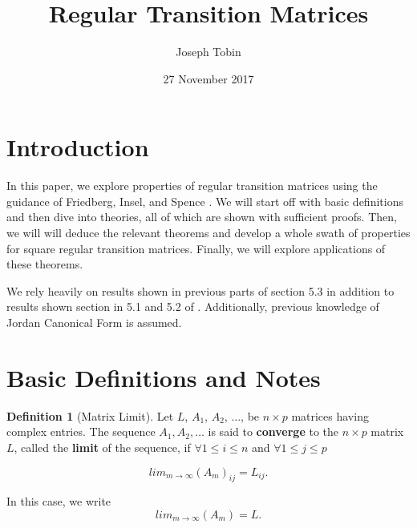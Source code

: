 \documentclass{amsart}
\title{Regular Transition Matrices}
\author{Joseph Tobin}
\date{27 November 2017}
\theoremstyle{definition}
\newtheorem{definition}[thm]{Definition}
\theoremstyle{remark}
\numberwithin{equation}{section}
\begin{document}
\maketitle




\section{Introduction}
In this paper, we explore properties of regular transition matrices using the guidance of Friedberg, Insel, and Spence \cite{friedberg2003linear}.
We will start off with basic definitions and then dive into theories, all of which are shown with sufficient proofs.
Then, we will will deduce the relevant theorems and develop a whole swath of properties for square regular transition matrices.
Finally, we will explore applications of these theorems.


We rely heavily on results shown in previous parts of section 5.3 in addition to results shown section in 5.1 and 5.2 of \cite{friedberg2003linear}.
Additionally, previous knowledge of Jordan Canonical Form is assumed.

\section{Basic Definitions and Notes}

\begin{definition}[Matrix Limit]
Let $L$, $A_1$, $A_2$, $\ldots$, be $n \times p$ matrices having complex entries.
The sequence $A_1, A_2, \ldots$ is said to \textbf{converge} to the $n \times p$ matrix $L$, called the \textbf{limit} of the sequence, if $\forall 1 \leq i \leq n$ and $\forall 1 \leq j \leq p$

$$lim_{m \to \infty}(A_m)_{ij} = L_{ij}.$$

In this case, we write $$ lim_{m \to \infty}(A_m) = L.$$


\end{definition}
\end{document}
